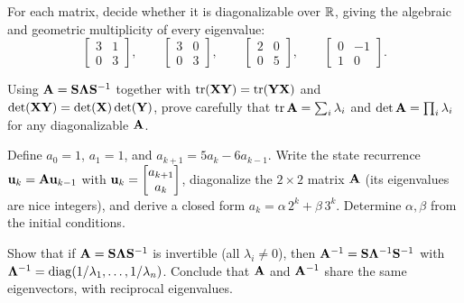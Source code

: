 \begin{exercise}
\label{ch24:ex-defective}
For each matrix, decide whether it is diagonalizable over $\mathbb{R}$, giving the
algebraic and geometric multiplicity of every eigenvalue:
\[
  \begin{bmatrix} 3 & 1 \\ 0 & 3 \end{bmatrix},
  \qquad
  \begin{bmatrix} 3 & 0 \\ 0 & 3 \end{bmatrix},
  \qquad
  \begin{bmatrix} 2 & 0 \\ 0 & 5 \end{bmatrix},
  \qquad
  \begin{bmatrix} 0 & -1 \\ 1 & 0 \end{bmatrix}.
\]
\end{exercise}

\begin{exercise}
\label{ch24:ex-tracedet}
Using $\mathbf{A} = \mathbf{S}\mathbf{\Lambda}\mathbf{S}^{-1}$ together with
$\operatorname{tr}(\mathbf{X}\mathbf{Y}) = \operatorname{tr}(\mathbf{Y}\mathbf{X})$ and $\det(\mathbf{X}\mathbf{Y}) =
\det(\mathbf{X})\det(\mathbf{Y})$, prove carefully that $\operatorname{tr}\mathbf{A} = \sum_i\lambda_i$
and $\det\mathbf{A} = \prod_i\lambda_i$ for any diagonalizable $\mathbf{A}$.
\end{exercise}

\begin{exercise}
\label{ch24:ex-recurrence}
Define $a_0 = 1$, $a_1 = 1$, and $a_{k+1} = 5a_k - 6a_{k-1}$. Write the state
recurrence $\mathbf{u}_k = \mathbf{A}\mathbf{u}_{k-1}$ with $\mathbf{u}_k =
\begin{bmatrix}a_{k+1}\\a_k\end{bmatrix}$, diagonalize the $2\times2$ matrix $\mathbf{A}$ (its
eigenvalues are nice integers), and derive a closed form $a_k = \alpha\,2^k +
\beta\,3^k$. Determine $\alpha,\beta$ from the initial conditions.
\end{exercise}

\begin{exercise}
\label{ch24:ex-inverse}
Show that if $\mathbf{A} = \mathbf{S}\mathbf{\Lambda}\mathbf{S}^{-1}$ is invertible (all
$\lambda_i\neq0$), then $\mathbf{A}^{-1} = \mathbf{S}\mathbf{\Lambda}^{-1}\mathbf{S}^{-1}$ with
$\mathbf{\Lambda}^{-1} = \operatorname{diag}(1/\lambda_1,\dots,1/\lambda_n)$. Conclude that
$\mathbf{A}$ and $\mathbf{A}^{-1}$ share the same eigenvectors, with reciprocal
eigenvalues.
\end{exercise}

